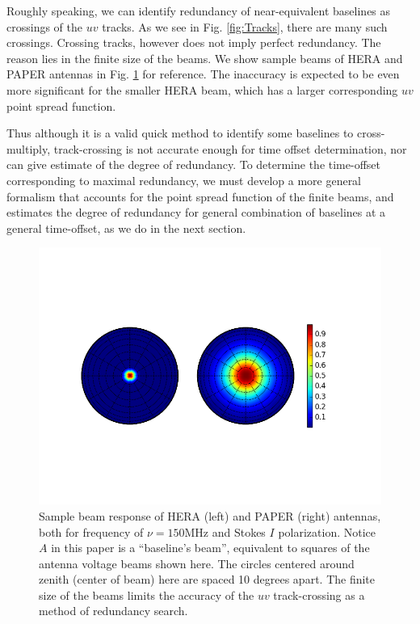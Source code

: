 \documentclass[twocolumn,apj,numberedappendix]{emulateapj}
\renewcommand\[{\begin{equation}}
\renewcommand\]{\end{equation}}
\begin{document}
Roughly speaking, we can identify
redundancy of near-equivalent baselines as crossings
of the $uv$ tracks. As we see in Fig. \ref{fig:Tracks}, there are many such crossings. Crossing tracks, however does not imply perfect redundancy. The reason lies in the finite size of the beams. We show sample beams of HERA and PAPER antennas in Fig. \ref{fig:Beam} for reference. The inaccuracy is expected to be even more significant for the smaller HERA beam, which has a larger corresponding $uv$ point spread function. 

Thus although it is a valid quick method to identify some baselines to cross-multiply, track-crossing is
not accurate enough for time offset determination, nor can give estimate of the degree of redundancy. To determine the time-offset corresponding to maximal redundancy, we must develop a more general  formalism that accounts for the point spread function of the finite beams, and estimates the degree of redundancy for general combination of baselines at a general time-offset, as we do in the next section.  


\begin{figure}[H]
\includegraphics[width=1.2\linewidth]{Beams}

\caption{Sample beam response of HERA (left) and PAPER (right) antennas, both
for frequency of $\nu=150\text{MHz}$ and Stokes $I$ polarization. Notice $A$ in this paper is a ``baseline's beam'', equivalent to squares of the antenna voltage beams shown here. The circles centered around zenith (center of beam) here are
spaced 10 degrees apart. The finite size of the beams limits the accuracy of the $uv$ track-crossing as a method of redundancy search. \label{fig:Beam}}
\end{figure}
\end{document}
